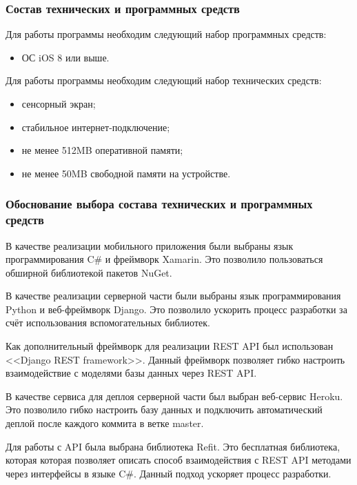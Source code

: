 \documentclass{../includes/TechDoc}
\begin{document}
    \subsubsection{Состав технических и программных средств}

    Для работы программы необходим следующий набор программных средств:
    \begin{itemize}
        \item ОС iOS 8 или выше.
    \end{itemize}

    Для работы программы необходим следующий набор технических средств:
    \begin{itemize}
        \item сенсорный экран;
        \item стабильное интернет-подключение;
        \item не менее 512MB оперативной памяти;
        \item не менее 50MB свободной памяти на устройстве.
    \end{itemize}

    \subsubsection{Обоснование выбора состава технических и программных средств}

    В качестве реализации мобильного приложения были выбраны язык программирования C\# и фреймворк Xamarin.
    Это позволило пользоваться обширной библиотекой пакетов NuGet.

    В качестве реализации серверной части были выбраны язык программирования Python и веб-фреймворк Django.
    Это позволило ускорить процесс разработки за счёт использования вспомогательных библиотек.

    Как дополнительный фреймворк для реализации REST API был использован <<Django REST framework>>.
    Данный фреймворк позволяет гибко настроить взаимодействие с моделями базы данных через REST API\@.

    В качестве сервиса для деплоя серверной части был выбран веб-сервис Heroku.
    Это позволило гибко настроить базу данных и подключить автоматический деплой после каждого коммита в ветке master.

    Для работы с API была выбрана библиотека Refit.
    Это бесплатная библиотека, которая которая позволяет описать способ взаимодействия с REST API методами через
    интерфейсы в языке C\#.
    Данный подход ускоряет процесс разработки.
\end{document}
